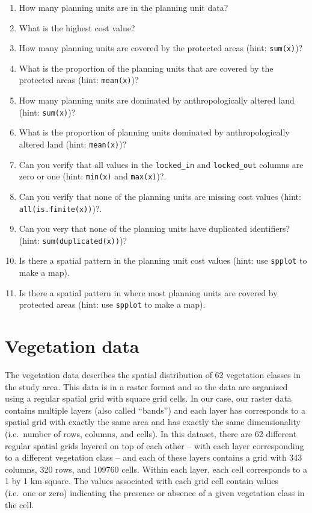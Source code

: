 \documentclass[12pt,]{book}
\providecommand{\tightlist}{%
  \setlength{\itemsep}{0pt}\setlength{\parskip}{0pt}}
\let\BeginKnitrBlock\begin \let\EndKnitrBlock\end
\begin{document}
\BeginKnitrBlock{rmdquestion}
\begin{enumerate}
\def\labelenumi{\arabic{enumi}.}
\tightlist
\item
  How many planning units are in the planning unit data?
\item
  What is the highest cost value?
\item
  How many planning units are covered by the protected areas (hint:
  \texttt{sum(x)})?
\item
  What is the proportion of the planning units that are covered by the
  protected areas (hint: \texttt{mean(x)})?
\item
  How many planning units are dominated by anthropologically altered
  land (hint: \texttt{sum(x)})?
\item
  What is the proportion of planning units dominated by
  anthropologically altered land (hint: \texttt{mean(x)})?
\item
  Can you verify that all values in the \texttt{locked\_in} and
  \texttt{locked\_out} columns are zero or one (hint: \texttt{min(x)}
  and \texttt{max(x)})?.
\item
  Can you verify that none of the planning units are missing cost values
  (hint: \texttt{all(is.finite(x))})?.
\item
  Can you very that none of the planning units have duplicated
  identifiers? (hint: \texttt{sum(duplicated(x))})?
\item
  Is there a spatial pattern in the planning unit cost values (hint: use
  \texttt{spplot} to make a map).
\item
  Is there a spatial pattern in where most planning units are covered by
  protected areas (hint: use \texttt{spplot} to make a map).
\end{enumerate}
\EndKnitrBlock{rmdquestion}

\clearpage

\section{Vegetation data}\label{vegetation-data}

The vegetation data describes the spatial distribution of 62 vegetation
classes in the study area. This data is in a raster format and so the
data are organized using a regular spatial grid with square grid cells.
In our case, our raster data contains multiple layers (also called
``bands'') and each layer has corresponds to a spatial grid with exactly
the same area and has exactly the same dimensionality (i.e.~number of
rows, columns, and cells). In this dataset, there are 62 different
regular spatial grids layered on top of each other -- with each layer
corresponding to a different vegetation class -- and each of these
layers contains a grid with 343 columns, 320 rows, and 109760 cells.
Within each layer, each cell corresponds to a 1 by 1 km square. The
values associated with each grid cell contain values (i.e.~one or zero)
indicating the presence or absence of a given vegetation class in the
cell.
\end{document}
